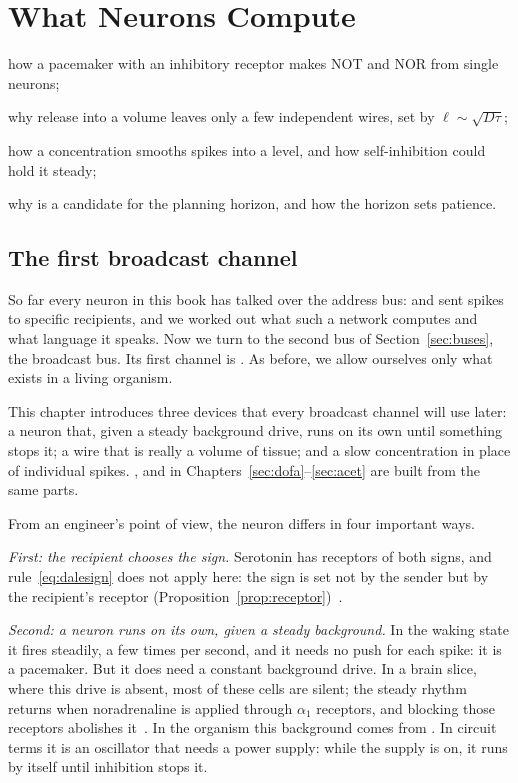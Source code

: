 \chapter{What  Neurons Compute}
\label{sec:serocomputer}
\begin{chaptergoals}
\item how a pacemaker with an inhibitory receptor makes NOT and NOR from single  neurons;
\item why release into a volume leaves only a few independent wires, set by $\ell\sim\sqrt{D\tau}$;
\item how a concentration smooths spikes into a level, and how self-inhibition could hold it steady;
\item why  is a candidate for the planning horizon, and how the horizon sets patience.
\end{chaptergoals}

\section{The first broadcast channel}

So far every neuron in this book has talked over the address bus:  and  sent spikes to specific recipients, and we worked out what such a network computes and what language it speaks. Now we turn to the second bus of Section~\ref{sec:buses}, the broadcast bus. Its first channel is . As before, we allow ourselves only what exists in a living organism.

This chapter introduces three devices that every broadcast channel will use later: a neuron that, given a steady background drive, runs on its own until something stops it; a wire that is really a volume of tissue; and a slow concentration in place of individual spikes. ,  and  in Chapters~\ref{sec:dofa}--\ref{sec:acet} are built from the same parts.

From an engineer's point of view, the  neuron differs in four important ways.

\emph{First: the recipient chooses the sign.} Serotonin has receptors of both signs, and rule~\eqref{eq:dalesign} does not apply here: the sign is set not by the sender but by the recipient's receptor (Proposition~\ref{prop:receptor})~\cite{BarnesSharp1999}.

\emph{Second: a  neuron runs on its own, given a steady background.} In the waking state it fires steadily, a few times per second, and it needs no push for each spike: it is a pacemaker. But it does need a constant background drive. In a brain slice, where this drive is absent, most of these cells are silent; the steady rhythm returns when noradrenaline is applied through $\alpha_1$ receptors, and blocking those receptors abolishes it~\cite{VandermaelenAghajanian1983}. In the organism this background comes from . In circuit terms it is an oscillator that needs a power supply: while the supply is on, it runs by itself until inhibition stops it.

